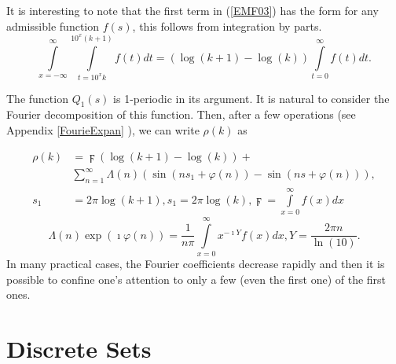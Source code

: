 \documentclass[titlepage,fleqn]{article}%
\begin{document}
It is interesting to note that the first term in (\ref{EMF03}) has the form
for any admissible function $f(s)$, this follows from integration by parts.%
\begin{equation}%
{\displaystyle\int\limits_{x=-\infty}^{\infty}}
{\displaystyle\int\limits_{t=10^{x}k}^{10^{x}\left(  k+1\right)  }}
f(t)dt=(\log\left(  k+1\right)  -\log\left(  k\right)  )%
{\displaystyle\int\limits_{t=0}^{\infty}}
f(t)dt. \label{EMF04}%
\end{equation}


The function $Q_{1}(s)$ is 1-periodic in its argument. It is natural to
consider the Fourier decomposition of this function. Then, after a few
operations (see Appendix
\ref{FourieExpan}%
), we can write $\rho(k)$ as%

\begin{align}
\rho(k)  &  =\digamma(\log\left(  k+1\right)  -\log\left(  k\right)
)+\label{EMF05}\\
&
{\displaystyle\sum\limits_{n=1}^{\infty}}
\Lambda(n)\left(  \sin\left(  ns_{1}+\varphi(n)\right)  -\sin\left(
ns+\varphi(n)\right)  \right)  ,\nonumber\\
s_{1}  &  =2\pi\log(k+1),s_{1}=2\pi\log(k),\digamma=%
{\displaystyle\int\limits_{x=0}^{\infty}}
f(x)dx
\end{align}%
\begin{equation}
\Lambda(n)\exp(\imath\varphi(n))=\frac{1}{n\pi}%
{\displaystyle\int\limits_{x=0}^{\infty}}
x^{-\imath Y}f(x)dx,Y=\frac{2\pi n}{\ln(10)}. \label{EMF07}%
\end{equation}
In many practical cases, the Fourier coefficients decrease rapidly and then it
is possible to confine one's attention to only a few (even the first one) of
the first ones.

\section{Discrete Sets}%

\label{Diocret Distributions}%
\end{document}
